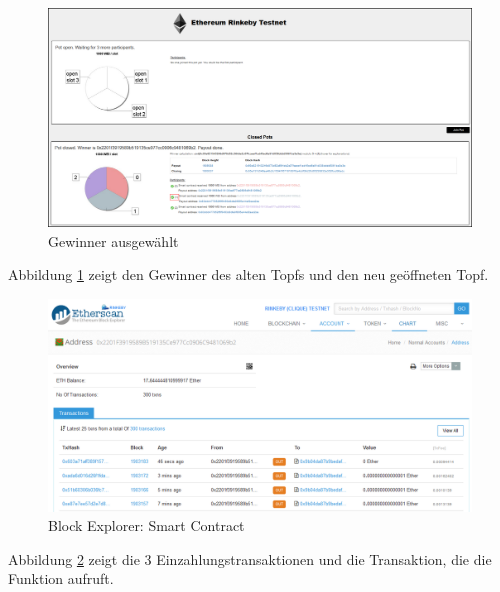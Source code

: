 \begin{figure}[H]
\centering
\includegraphics[width=1\linewidth]{Figures/eth_gui/ETH_pot_finished}
\decoRule
\caption{Gewinner ausgewählt}
\label{fig:ETH_pot_finished}
\end{figure}

\noindent Abbildung \ref{fig:ETH_pot_finished} zeigt den Gewinner des alten Topfs und den neu geöffneten Topf.

\begin{figure}[H]
\centering
\includegraphics[width=1\linewidth]{Figures/eth_gui/contract_transactions}
\decoRule
\caption{Block Explorer: Smart Contract}
\label{fig:contract_transactions}
\end{figure}

\noindent Abbildung \ref{fig:contract_transactions} zeigt die 3 Einzahlungstransaktionen und die Transaktion, die die  Funktion aufruft.

